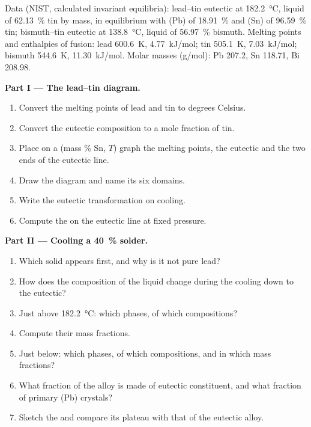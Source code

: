 \begin{problem}
\label{pb:b2:solid-liquid-diagrams:1}
Data (NIST, calculated invariant equilibria): lead--tin eutectic at
\qty{182.2}{\degreeCelsius}, liquid of 62.13~\% tin by mass, in equilibrium with
(Pb) of 18.91~\% and (Sn) of 96.59~\% tin; bismuth--tin eutectic at
\qty{138.8}{\degreeCelsius}, liquid of 56.97~\% bismuth. Melting points and
enthalpies of fusion: lead \qty{600.6}{K}, \qty{4.77}{kJ/mol}; tin
\qty{505.1}{K}, \qty{7.03}{kJ/mol}; bismuth \qty{544.6}{K}, \qty{11.30}{kJ/mol}.
Molar masses (\unit{g/mol}): Pb 207.2, Sn 118.71, Bi 208.98.

\medskip
\noindent\textbf{Part I --- The lead--tin diagram.}
\begin{enumerate}
  \item Convert the melting points of lead and tin to degrees Celsius.
  \item Convert the eutectic composition to a mole fraction of tin.
  \item Place on a (mass \% Sn, $T$) graph the melting points, the eutectic and
        the two ends of the eutectic line.
  \item Draw the diagram and name its six domains.
  \item Write the eutectic transformation on cooling.
  \item Compute the  on the eutectic line at fixed pressure.
\end{enumerate}

\medskip
\noindent\textbf{Part II --- Cooling a 40~\% solder.}
\begin{enumerate}[resume]
  \item Which solid appears first, and why is it not pure lead?
  \item How does the composition of the liquid change during the cooling down
        to the eutectic?
  \item Just above \qty{182.2}{\degreeCelsius}: which phases, of which
        compositions?
  \item Compute their mass fractions.
  \item Just below: which phases, of which compositions, and in which mass
        fractions?
  \item What fraction of the alloy is made of eutectic constituent, and what
        fraction of primary (Pb) crystals?
  \item Sketch the  and compare its plateau with that of the
        eutectic alloy.
\end{enumerate}


\end{problem}
